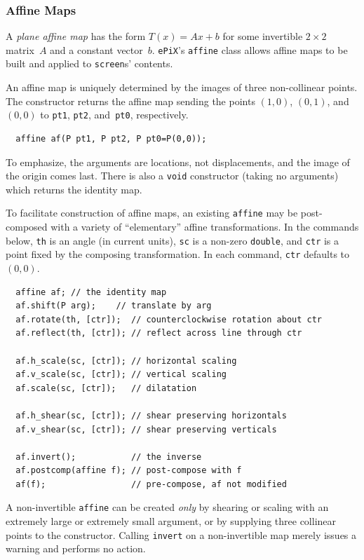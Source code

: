 \documentclass[12pt,letterpaper]{book}
\newcommand{\code}[1]{\texttt{#1}}
\newcommand{\ePiX}{\code{ePiX}}
\newcommand{\teximath}[1]{$#1$}
\newcommand{\findex}[1]{\ignorespaces}
\begin{document}
\subsubsection*{Affine Maps}

A \emph{plane affine map} has the form \teximath{T(x) = Ax+b} for some
invertible \teximath{2\times2} matrix~\teximath{A} and a constant
vector~\teximath{b}. \ePiX's \code{affine} class allows affine maps to
be built and applied to \code{screen}s' contents.

An affine map is uniquely determined by the images of three
non-collinear points.  The constructor returns the affine map sending
the points \teximath{(1,0)}, \teximath{(0,1)}, and~\teximath{(0,0)} to
\code{pt1}, \code{pt2}, and~\code{pt0}, respectively.
\findex{affine}
\begin{verbatim}
  affine af(P pt1, P pt2, P pt0=P(0,0));
\end{verbatim}
To emphasize, the arguments are locations, not displacements, and the
image of the origin comes last.  There is also a \code{void}
constructor (taking no arguments) which returns the identity map.

To facilitate construction of affine maps, an existing \code{affine}
may be post-composed with a variety of ``elementary'' affine
transformations. In the commands below, \code{th} is an angle (in
current units), \code{sc} is a non-zero \code{double}, and \code{ctr}
is a point fixed by the composing transformation. In each command,
\code{ctr} defaults to \teximath{(0,0)}.
\findex{shift}
\findex{rotate}
\findex{reflect}
\findex{h\_scale}
\findex{v\_scale}
\findex{scale}
\findex{h\_shear}
\findex{v\_shear}
\findex{postcomp}
\begin{verbatim}
  affine af; // the identity map
  af.shift(P arg);    // translate by arg
  af.rotate(th, [ctr]);  // counterclockwise rotation about ctr
  af.reflect(th, [ctr]); // reflect across line through ctr

  af.h_scale(sc, [ctr]); // horizontal scaling
  af.v_scale(sc, [ctr]); // vertical scaling
  af.scale(sc, [ctr]);   // dilatation

  af.h_shear(sc, [ctr]); // shear preserving horizontals
  af.v_shear(sc, [ctr]); // shear preserving verticals

  af.invert();           // the inverse
  af.postcomp(affine f); // post-compose with f
  af(f);                 // pre-compose, af not modified
\end{verbatim}
A non-invertible \code{affine} can be created \emph{only} by shearing
or scaling with an extremely large or extremely small argument, or by
supplying three collinear points to the constructor.  Calling
\code{invert} on a non-invertible map merely issues a warning and
performs no action.
\end{document}
